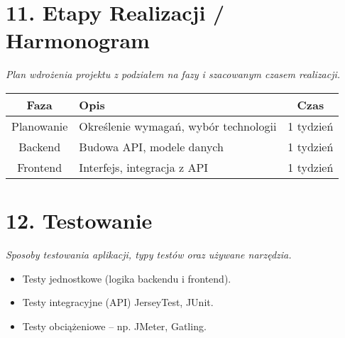 \documentclass[a4paper,12pt]{article}
\begin{document}
\section*{11. Etapy Realizacji / Harmonogram}
\textit{Plan wdrożenia projektu z podziałem na fazy i szacowanym czasem realizacji.}

\vspace{0.5 cm}
 \noindent
\begin{longtable}{|c|p{8cm}|c|}
\hline
\textbf{Faza} & \textbf{Opis} & \textbf{Czas} \\
\hline
Planowanie & Określenie wymagań, wybór technologii & 1 tydzień \\
\hline
Backend & Budowa API, modele danych & 1 tydzień \\
\hline
Frontend & Interfejs, integracja z API & 1 tydzień \\
\hline
\end{longtable}

\section*{12. Testowanie}
\textit{Sposoby testowania aplikacji, typy testów oraz używane narzędzia.}

\vspace{0.5 cm}
 \noindent
\begin{itemize}
    \item Testy jednostkowe (logika backendu i frontend).
    \item Testy integracyjne (API) JerseyTest, JUnit.
    \item Testy obciążeniowe – np. JMeter, Gatling.
\end{itemize}
\end{document}
